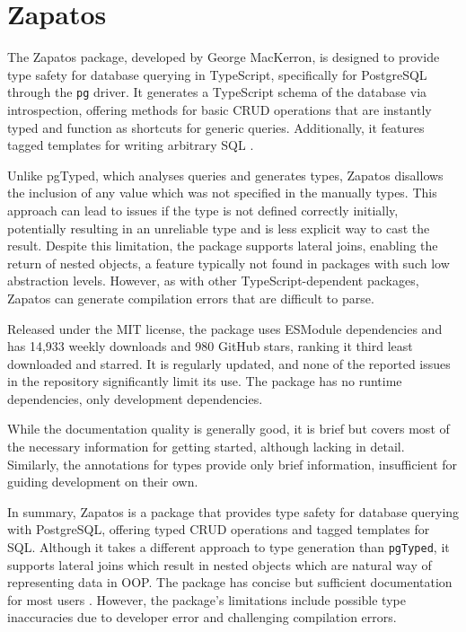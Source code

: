 \section{Zapatos}
The Zapatos package, developed by George MacKerron, is designed to provide type
safety for database querying in TypeScript, specifically for PostgreSQL through
the \texttt{pg} driver. It generates a TypeScript schema of the database via
introspection, offering methods for basic CRUD operations that are instantly
typed and function as shortcuts for generic queries. Additionally, it features
tagged templates for writing arbitrary SQL \cite{zapatos}.

Unlike pgTyped, which analyses queries and generates types, Zapatos disallows
the inclusion of any value which was not specified in the manually types. This
approach can lead to issues if the type is not defined correctly initially,
potentially resulting in an unreliable type and is less explicit way to cast the
result. Despite this limitation, the package supports lateral joins, enabling
the return of nested objects, a feature typically not found in packages with
such low abstraction levels. However, as with other TypeScript-dependent
packages, Zapatos can generate compilation errors that are difficult to parse.

Released under the MIT license, the package uses ESModule dependencies and has
14,933 weekly downloads and 980 GitHub stars, ranking it third least downloaded
and starred. It is regularly updated, and none of the reported issues in the
repository significantly limit its use. The package has no runtime dependencies,
only development dependencies.

While the documentation quality is generally good, it is brief but covers most
of the necessary information for getting started, although lacking in detail.
Similarly, the annotations for types provide only brief information,
insufficient for guiding development on their own.

In summary, Zapatos is a package that provides type safety for database querying
with PostgreSQL, offering typed CRUD operations and tagged templates for SQL.
Although it takes a different approach to type generation than \texttt{pgTyped},
it supports lateral joins which result in nested objects which are natural way
of representing data in OOP. The package has concise but sufficient
documentation for most users \cite{zapatosDocs}. However, the package's
limitations include possible type inaccuracies due to developer error and
challenging compilation errors. 


